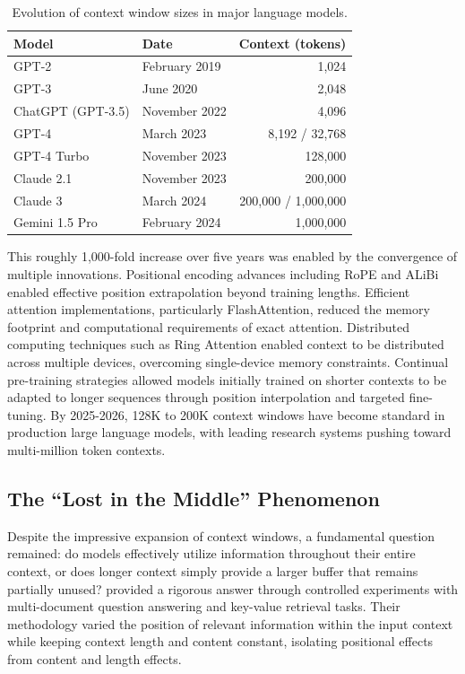 \begin{table}[H]
\centering
\caption{Evolution of context window sizes in major language models.}
\begin{tabular}{llr}
\toprule
\textbf{Model} & \textbf{Date} & \textbf{Context (tokens)} \\
\midrule
GPT-2 & February 2019 & 1,024 \\
GPT-3 & June 2020 & 2,048 \\
ChatGPT (GPT-3.5) & November 2022 & 4,096 \\
GPT-4 & March 2023 & 8,192 / 32,768 \\
GPT-4 Turbo & November 2023 & 128,000 \\
Claude 2.1 & November 2023 & 200,000 \\
Claude 3 & March 2024 & 200,000 / 1,000,000 \\
Gemini 1.5 Pro & February 2024 & 1,000,000 \\
\bottomrule
\end{tabular}
\end{table}

This roughly 1,000-fold increase over five years was enabled by the convergence of multiple innovations. Positional encoding advances including RoPE and ALiBi enabled effective position extrapolation beyond training lengths. Efficient attention implementations, particularly FlashAttention, reduced the memory footprint and computational requirements of exact attention. Distributed computing techniques such as Ring Attention enabled context to be distributed across multiple devices, overcoming single-device memory constraints. Continual pre-training strategies allowed models initially trained on shorter contexts to be adapted to longer sequences through position interpolation and targeted fine-tuning. By 2025-2026, 128K to 200K context windows have become standard in production large language models, with leading research systems pushing toward multi-million token contexts.

\subsection{The ``Lost in the Middle'' Phenomenon}

Despite the impressive expansion of context windows, a fundamental question remained: do models effectively utilize information throughout their entire context, or does longer context simply provide a larger buffer that remains partially unused? \citet{liu2024lost} provided a rigorous answer through controlled experiments with multi-document question answering and key-value retrieval tasks. Their methodology varied the position of relevant information within the input context while keeping context length and content constant, isolating positional effects from content and length effects.

